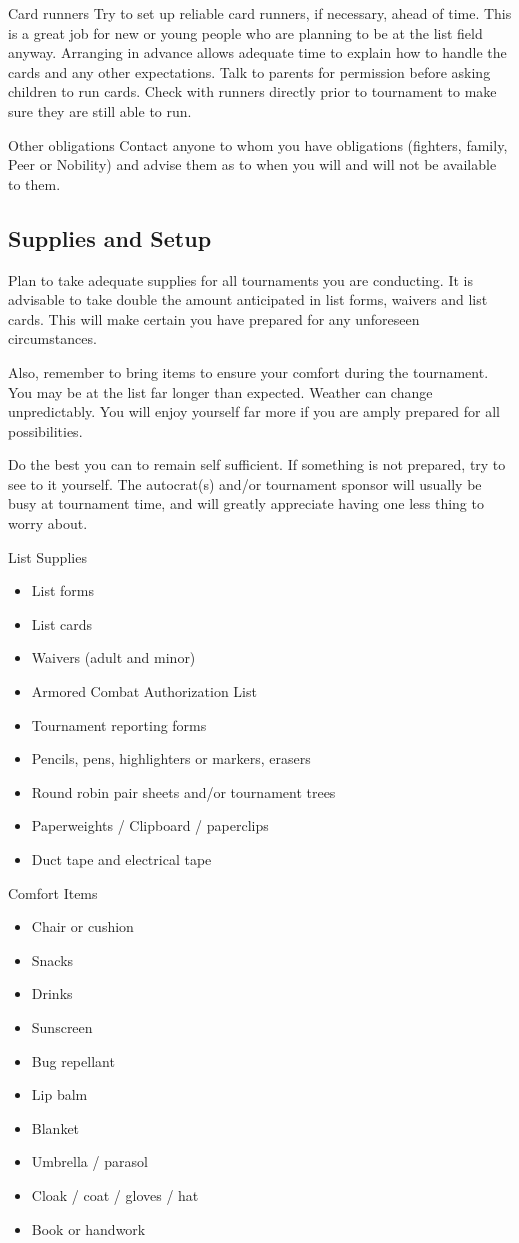\documentclass{article}
\begin{document}
Card runners Try to set up reliable card runners, if necessary, ahead of time. This
is a great job for new or young people who are planning to be at the
list field anyway. Arranging in advance allows adequate time to
explain how to handle the cards and any other expectations. Talk to
parents for permission before asking children to run cards. Check
with runners directly prior to tournament to make sure they are still
able to run.

Other obligations Contact anyone to whom you have obligations (fighters, family, Peer
or Nobility) and advise them as to when you will and will not be
available to them.

\subsection{Supplies and Setup}
Plan to take adequate supplies for all tournaments you are conducting. It is advisable to take double the
amount anticipated in list forms, waivers and list cards. This will make certain you have prepared for any
unforeseen circumstances.

Also, remember to bring items to ensure your comfort during the tournament. You may be at the list far
longer than expected. Weather can change unpredictably. You will enjoy yourself far more if you are
amply prepared for all possibilities.

Do the best you can to remain self sufficient. If something is not prepared, try to see to it yourself. The
autocrat(s) and/or tournament sponsor will usually be busy at tournament time, and will greatly appreciate
having one less thing to worry about.

List Supplies
\begin{itemize}
\item List forms
\item List cards
\item Waivers (adult and minor)
\item Armored Combat Authorization List
\item Tournament reporting forms
\item Pencils, pens, highlighters or markers, erasers
\item Round robin pair sheets and/or tournament trees
\item Paperweights / Clipboard / paperclips
\item Duct tape and electrical tape
\end{itemize}

Comfort Items
\begin{itemize}
\item Chair or cushion
\item Snacks
\item Drinks
\item Sunscreen
\item Bug repellant
\item Lip balm
\item Blanket
\item Umbrella / parasol
\item Cloak / coat / gloves / hat
\item Book or handwork
\end{itemize}
\end{document}
